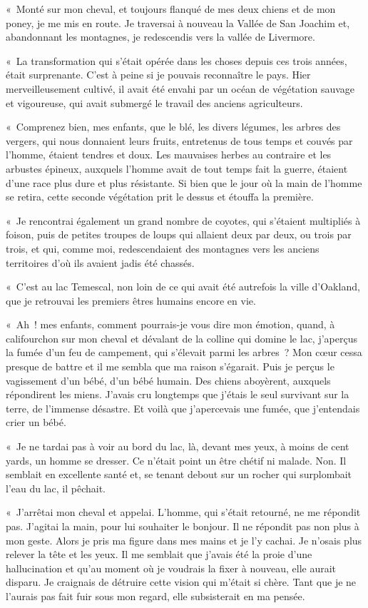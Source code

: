 \documentclass[french,twoside]{book} %
\newcommand\chaptercont{} %
\begin{document}
\chaptercont
\noindent « Monté sur mon cheval, et toujours flanqué de mes deux chiens et de mon poney, je me mis en route. Je traversai à nouveau la Vallée de San Joachim et, abandonnant les montagnes, je redescendis vers la vallée de Livermore.\par
« La transformation qui s’était opérée dans les choses depuis ces trois années, était surprenante. C’est à peine si je pouvais reconnaître le pays. Hier merveilleusement cultivé, il avait été envahi par un océan de végétation sauvage et vigoureuse, qui avait submergé le travail des anciens agriculteurs.\par
« Comprenez bien, mes enfants, que le blé, les divers légumes, les arbres des vergers, qui nous donnaient leurs fruits, entretenus de tous temps et couvés par l’homme, étaient tendres et doux. Les mauvaises herbes au contraire et les arbustes épineux, auxquels l’homme avait de tout temps fait la guerre, étaient d’une race plus dure et plus résistante. Si bien que le jour où la main de l’homme se retira, cette seconde végétation prit le dessus et étouffa la première.\par
« Je rencontrai également un grand nombre de coyotes, qui s’étaient multipliés à foison, puis de petites troupes de loups qui allaient deux par deux, ou trois par trois, et qui, comme moi, redescendaient des montagnes vers les anciens territoires d’où ils avaient jadis été chassés.\par
« C’est au lac Temescal, non loin de ce qui avait été autrefois la ville d’Oakland, que je retrouvai les premiers êtres humains encore en vie.\par
« Ah ! mes enfants, comment pourrais-je vous dire mon émotion, quand, à califourchon sur mon cheval et dévalant de la colline qui domine le lac, j’aperçus la fumée d’un feu de campement, qui s’élevait parmi les arbres ? Mon cœur cessa presque de battre et il me sembla que ma raison s’égarait. Puis je perçus le vagissement d’un bébé, d’un bébé humain. Des chiens aboyèrent, auxquels répondirent les miens. J’avais cru longtemps que j’étais le seul survivant sur la terre, de l’immense désastre. Et voilà que j’apercevais une fumée, que j’entendais crier un bébé.\par
« Je ne tardai pas à voir au bord du lac, là, devant mes yeux, à moins de cent yards, un homme se dresser. Ce n’était point un être chétif ni malade. Non. Il semblait en excellente santé et, se tenant debout sur un rocher qui surplombait l’eau du lac, il pêchait.\par
« J’arrêtai mon cheval et appelai. L’homme, qui s’était retourné, ne me répondit pas. J’agitai la main, pour lui souhaiter le bonjour. Il ne répondit pas non plus à mon geste. Alors je pris ma figure dans mes mains et je l’y cachai. Je n’osais plus relever la tête et les yeux. Il me semblait que j’avais été la proie d’une hallucination et qu’au moment où je voudrais la fixer à nouveau, elle aurait disparu. Je craignais de détruire cette vision qui m’était si chère. Tant que je ne l’aurais pas fait fuir sous mon regard, elle subsisterait en ma pensée.\par
\end{document}
